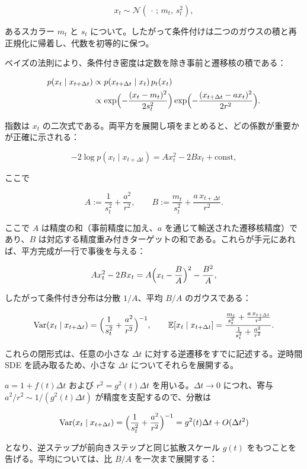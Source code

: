 \[
x_t\sim\mathcal{N}(\,\cdot\,;\, m_t,\, s_t^2),
\]


あるスカラー $m_t$ と $s_t$ について。したがって条件付けは二つのガウスの積と再正規化に帰着し、代数を初等的に保つ。

ベイズの法則により、条件付き密度は定数を除き事前と遷移核の積である：

\begin{align*}
\begin{aligned}
p(x_t\mid x_{t+\Delta t})
&\propto p(x_{t+\Delta t}\mid x_t)\, p_t(x_t) \\
&\propto \exp\Bigl(-\frac{(x_t-m_t)^2}{2s_t^2}\Bigr)
\exp\Bigl(-\frac{(x_{t+\Delta t}-a x_t)^2}{2r^2}\Bigr).
\end{aligned}
\end{align*}


指数は $x_t$ の二次式である。両平方を展開し項をまとめると、どの係数が重要かが正確に示される：

\[
-2\log p(x_t\mid x_{t+\Delta t}) = A x_t^2 - 2B x_t + \mathrm{const},
\]


ここで

\[
A:=\frac{1}{s_t^2}+\frac{a^2}{r^2}, \qquad
B:=\frac{m_t}{s_t^2}+\frac{a\, x_{t+\Delta t}}{r^2}.
\]


ここで $A$ は精度の和（事前精度に加え、$a$ を通じて輸送された遷移核精度）であり、$B$ は対応する精度重み付きターゲットの和である。これらが手元にあれば、平方完成が一行で事後を与える：

\[
A x_t^2 - 2B x_t = A\Bigl(x_t-\frac{B}{A}\Bigr)^2 - \frac{B^2}{A},
\]


したがって条件付き分布は分散 $1/A$、平均 $B/A$ のガウスである：

\[
\mathrm{Var}(x_t\mid x_{t+\Delta t})=\Bigl(\frac{1}{s_t^2}+\frac{a^2}{r^2}\Bigr)^{-1}, \qquad
\mathbb{E}[x_t\mid x_{t+\Delta t}]=\frac{\frac{m_t}{s_t^2}+\frac{a\, x_{t+\Delta t}}{r^2}}{\frac{1}{s_t^2}+\frac{a^2}{r^2}}.
\]


これらの閉形式は、任意の小さな $\Delta t$ に対する逆遷移をすでに記述する。逆時間 SDE を読み取るため、小さな $\Delta t$ についてそれらを展開する。

$a=1+f(t)\Delta t$ および $r^2=g^2(t)\Delta t$ を用いる。$\Delta t\to 0$ につれ、寄与 $a^2/r^2\sim 1/(g^2(t)\Delta t)$ が精度を支配するので、分散は

\[
\mathrm{Var}(x_t\mid x_{t+\Delta t})=\Bigl(\frac{1}{s_t^2}+\frac{a^2}{r^2}\Bigr)^{-1}=g^2(t)\Delta t+O(\Delta t^2)
\]


となり、逆ステップが前向きステップと同じ拡散スケール $g(t)$ をもつことを告げる。平均については、比 $B/A$ を一次まで展開する：

